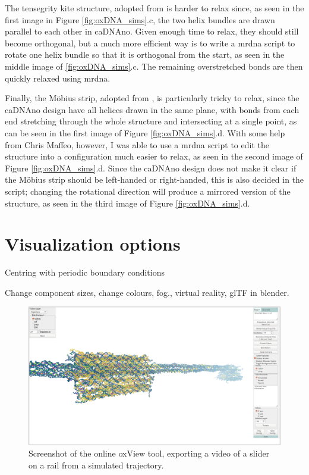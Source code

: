 The tensegrity kite structure, adopted from \cite{liedl2010_kite} is harder to relax since, as seen in the first image in Figure \ref{fig:oxDNA_sims}.c, the two helix bundles are drawn parallel to each other in caDNAno. Given enough time to relax, they should still become orthogonal, but a much more efficient way is to write a mrdna script to rotate one helix bundle so that it is orthogonal from the start, as seen in the middle image of \ref{fig:oxDNA_sims}.c. The remaining overstretched bonds are then quickly relaxed using mrdna.

Finally, the Möbius strip, adopted from \cite{han2010moebius}, is particularly tricky to relax, since the caDNAno design have all helices drawn in the same plane, with bonds from each end stretching through the whole structure and intersecting at a single point, as can be seen in the first image of Figure \ref{fig:oxDNA_sims}.d. With some help from Chris Maffeo, however, I was able to use a mrdna script to edit the structure into a configuration much easier to relax, as seen in the second image of Figure \ref{fig:oxDNA_sims}.d. Since the caDNAno design does not make it clear if the Möbius strip should be left-handed or right-handed, this is also decided in the script; changing the rotational direction will produce a mirrored version of the structure, as seen in the third image of Figure \ref{fig:oxDNA_sims}.d.

\section{Visualization options}
Centring with periodic boundary conditions

Change component sizes, change colours, fog., virtual reality, glTF in blender.

\begin{figure}
\centering\includegraphics[width=\textwidth]{figures/oxview.png} 
\caption{Screenshot of the online oxView tool, exporting a video of a slider on a rail from a simulated trajectory.}
\label{fig:oxview}\end{figure}

